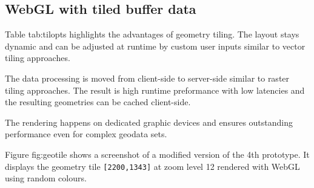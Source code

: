     \subsection{WebGL with tiled buffer data}
      \label{sec:imple:applc:buffr}
      Table {tab:tilopts} highlights the advantages of geometry tiling. The layout stays dynamic and can be adjusted at runtime by custom user inputs similar to vector tiling approaches.\par
      The data processing is moved from client-side to server-side similar to raster tiling approaches. The result is high runtime preformance with low latencies and the resulting geometries can be cached client-side.\par
      The rendering happens on dedicated graphic devices and ensures outstanding performance even for complex geodata sets.

      Figure {fig:geotile} shows a screenshot of a modified version of the 4th prototype. It displays the geometry tile \texttt{[2200,1343]} at zoom level 12 rendered with WebGL using random colours.

